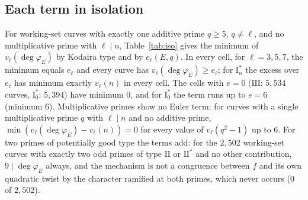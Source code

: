 \documentclass[11pt]{amsart}
\theoremstyle{definition}
\newcommand{\degphi}{\deg\varphi_E}
\begin{document}
\subsection{Each term in isolation}\label{sec:iso}
For working-set curves with exactly one additive prime $q\ge5$, $q\ne\ell$, and no multiplicative prime with $\ell\mid n$, Table~\ref{tab:iso} gives the minimum of $v_\ell(\degphi)$ by Kodaira type and by $e_\ell(E,q)$. In every cell, for $\ell=3,5,7$, the minimum equals $e_\ell$ and every curve has $v_\ell(\degphi)\ge e_\ell$; for $\mathrm{I}_n^*$ the excess over $e_\ell$ has minimum exactly $v_\ell(n)$ in every cell. The cells with $e=0$ ($\mathrm{III}$: $5{,}534$ curves, $\mathrm{I}_0^*$: $5{,}394$) have minimum $0$, and for $\mathrm{I}_0^*$ the term runs up to $e=6$ (minimum $6$). Multiplicative primes show no Euler term: for curves with a single multiplicative prime $q$ with $\ell\mid n$ and no additive prime, $\min(v_\ell(\degphi)-v_\ell(n))=0$ for every value of $v_\ell(q^2-1)$ up to $6$. For two primes of potentially good type the terms add: for the $2{,}502$ working-set curves with exactly two odd primes of type $\mathrm{II}$ or $\mathrm{II}^*$ and no other contribution, $9\mid\degphi$ always, and the mechanism is not a congruence between $f$ and its own quadratic twist by the character ramified at both primes, which never occurs ($0$ of $2{,}502$).

\begin{table}[ht]\centering\footnotesize

\caption{Working set, $\ell=3$: minimum of $v_3(\degphi)$ (number of curves) over curves with $E[3]$ irreducible whose only additive prime is a single $q\ge5$ of the given type with $e_3(E,q)=e$, and no multiplicative $3$-contribution. The same holds at $\ell=5$ and $7$.}\label{tab:iso}
\end{table}
\end{document}
